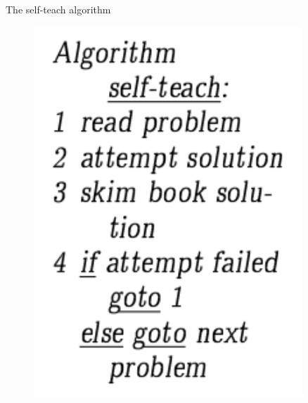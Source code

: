 \documentclass[handout]{beamer}
\begin{document}
\begin{frame}{The self-teach algorithm}
    \begin{figure}[htbp]
        \centering
        \begin{minipage}{0.3\textwidth}
            \centering
            \includegraphics[width=0.9\textwidth]{figures/self-teach.png}
        \end{minipage}
        \begin{minipage}{0.3\textwidth}
            \centering

\end{minipage}
\end{figure}
\end{frame}
\end{document}
